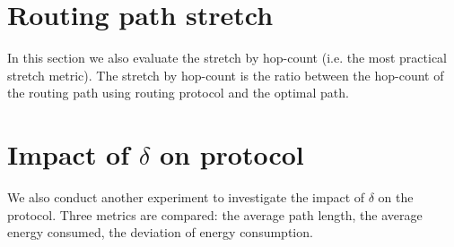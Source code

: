 \section{Routing path stretch}
In this section we also evaluate the stretch by hop-count (i.e. the most practical stretch metric). The stretch by hop-count is the ratio between the hop-count of the routing path using routing protocol and the optimal path.

\section{Impact of $\delta$ on protocol}
We also conduct another experiment to investigate the impact of $\delta$ on the protocol. Three metrics are compared: the average path length, the average energy consumed, the deviation of energy consumption.

